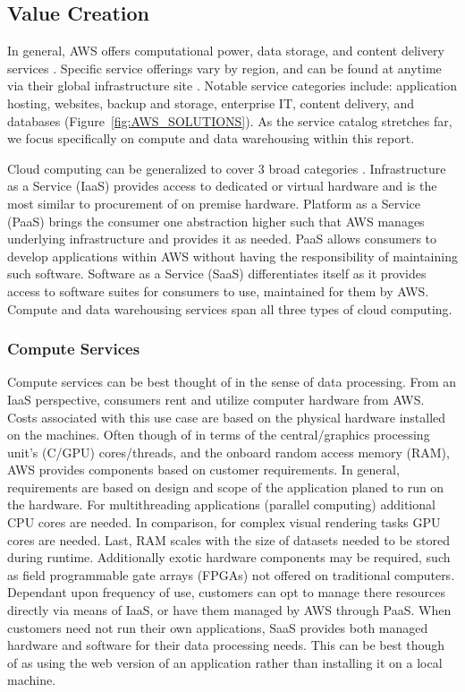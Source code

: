 \documentclass[a4paper, 12pt]{article}
\begin{document}
\subsection{Value Creation}
In general, AWS offers computational power, data storage, and content delivery services \cite[p.~10]{AMZN_AWS_WHITEPAPER}. 
Specific service offerings vary by region, and can be found at anytime via their global infrastructure site \cite{AMZN_AWS_REGIONAL_SERVICES}. 
Notable service categories include: application hosting, websites, backup and storage, enterprise IT, content delivery, and databases (Figure~\ref{fig:AWS_SOLUTIONS}). 
As the service catalog stretches far, we focus specifically on compute and data warehousing within this report.

Cloud computing can be generalized to cover 3 broad categories \cite{AMZN_AWS_CLOUD_COMPUTE}. 
Infrastructure as a Service (IaaS) provides access to dedicated or virtual hardware and is the most similar to procurement of on premise hardware. 
Platform as a Service (PaaS) brings the consumer one abstraction higher such that AWS manages underlying infrastructure and provides it as needed. 
PaaS allows consumers to develop applications within AWS without having the responsibility of maintaining such software. 
Software as a Service (SaaS) differentiates itself as it provides access to software suites for consumers to use, maintained for them by AWS. 
Compute and data warehousing services span all three types of cloud computing. 

\subsubsection{Compute Services}
Compute services can be best thought of in the sense of data processing. 
From an IaaS perspective, consumers rent and utilize computer hardware from AWS.
Costs associated with this use case are based on the physical hardware installed on the machines. 
Often though of in terms of the central/graphics processing unit's (C/GPU) cores/threads, and the onboard random access memory (RAM), AWS provides components based on customer requirements. 
In general, requirements are based on design and scope of the application planed to run on the hardware. 
For multithreading applications (parallel computing) additional CPU cores are needed. 
In comparison, for complex visual rendering tasks GPU cores are needed. 
Last, RAM scales with the size of datasets needed to be stored during runtime. 
Additionally exotic hardware components may be required, such as field programmable gate arrays (FPGAs) not offered on traditional computers. 
Dependant upon frequency of use, customers can opt to manage there resources directly via means of IaaS, or have them managed by AWS through PaaS. 
When customers need not run their own applications, SaaS provides both managed hardware and software for their data processing needs. 
This can be best though of as using the web version of an application rather than installing it on a local machine. 
\end{document}
